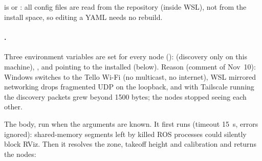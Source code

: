 \subsection{\texorpdfstring{}{real.launch.py}}

 is  or : all config files are
read from the repository (inside WSL), not from the install space, so editing a YAML needs no rebuild.

\paragraph{.} Three environment variables are set for every node
():  (discovery only on this machine),
, and  pointing to the installed
 (below). Reason (comment of Nov~10): Windows switches to the Tello Wi-Fi (no multicast,
no internet), WSL mirrored networking drops fragmented UDP on the loopback, and with Tailscale running the discovery
packets grew beyond 1500 bytes; the nodes stopped seeing each other.

The  body, run when the arguments are known. It first runs  (timeout
15~s, errors ignored): shared-memory segments left by killed ROS processes could silently block RViz. Then it
resolves the zone, takeoff height and calibration and returns the nodes:

